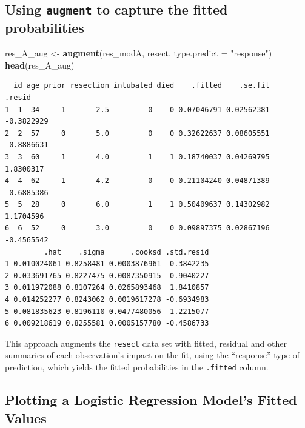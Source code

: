 \documentclass[]{book}
\newenvironment{Shaded}{\begin{snugshade}}{\end{snugshade}}
\newcommand{\KeywordTok}[1]{\textcolor[rgb]{0.13,0.29,0.53}{\textbf{#1}}}
\newcommand{\DataTypeTok}[1]{\textcolor[rgb]{0.13,0.29,0.53}{#1}}
\newcommand{\StringTok}[1]{\textcolor[rgb]{0.31,0.60,0.02}{#1}}
\newcommand{\NormalTok}[1]{#1}
\theoremstyle{definition}
\theoremstyle{definition}
\theoremstyle{definition}
\theoremstyle{remark}
\begin{document}
\subsection{\texorpdfstring{Using \texttt{augment} to capture the fitted
probabilities}{Using augment to capture the fitted probabilities}}\label{using-augment-to-capture-the-fitted-probabilities}

\begin{Shaded}
\begin{Highlighting}[]
\NormalTok{res_A_aug <-}\StringTok{ }\KeywordTok{augment}\NormalTok{(res_modA, resect, }
                     \DataTypeTok{type.predict =} \StringTok{"response"}\NormalTok{)}
\KeywordTok{head}\NormalTok{(res_A_aug)}
\end{Highlighting}
\end{Shaded}

\begin{verbatim}
  id age prior resection intubated died    .fitted    .se.fit     .resid
1  1  34     1       2.5         0    0 0.07046791 0.02562381 -0.3822929
2  2  57     0       5.0         0    0 0.32622637 0.08605551 -0.8886631
3  3  60     1       4.0         1    1 0.18740037 0.04269795  1.8300317
4  4  62     1       4.2         0    0 0.21104240 0.04871389 -0.6885386
5  5  28     0       6.0         1    1 0.50409637 0.14302982  1.1704596
6  6  52     0       3.0         0    0 0.09897375 0.02867196 -0.4565542
         .hat    .sigma      .cooksd .std.resid
1 0.010024061 0.8258481 0.0003876961 -0.3842235
2 0.033691765 0.8227475 0.0087350915 -0.9040227
3 0.011972088 0.8107264 0.0265893468  1.8410857
4 0.014252277 0.8243062 0.0019617278 -0.6934983
5 0.081835623 0.8196110 0.0477480056  1.2215077
6 0.009218619 0.8255581 0.0005157780 -0.4586733
\end{verbatim}

This approach augments the \texttt{resect} data set with fitted,
residual and other summaries of each observation's impact on the fit,
using the ``response'' type of prediction, which yields the fitted
probabilities in the \texttt{.fitted} column.

\subsection{Plotting a Logistic Regression Model's Fitted
Values}\label{plotting-a-logistic-regression-models-fitted-values}
\end{document}
